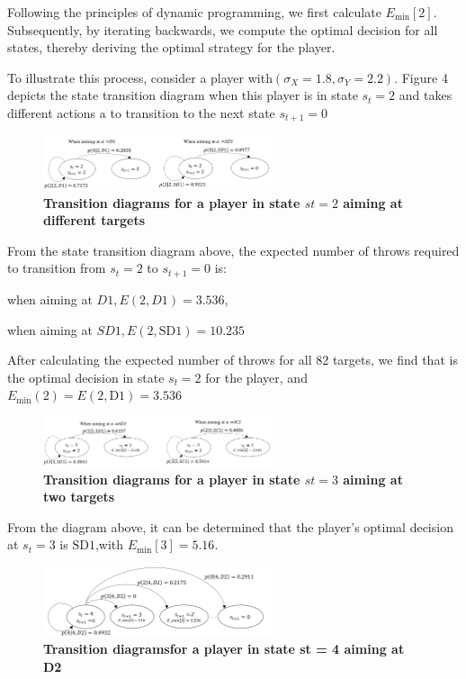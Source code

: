 \documentclass[cjjs]{ipart}
\theoremstyle{plain}
\begin{document}
Following the principles of dynamic programming, we first calculate $E_{\min}[2]$. Subsequently, by iterating backwards, we compute the optimal decision for all states, thereby deriving the optimal strategy for the player.

To illustrate this process, consider a player with$(\sigma_X = 1.8, \sigma_Y = 2.2)$. Figure 4 depicts the state transition diagram when this player is in state $s_t = 2$ and takes different actions a to transition to the next state $s_{t+1} = 0$

\begin{figure}[h]
    \centering
    \includegraphics[width=0.60\textwidth]{6.png} 
    \caption{\textbf{Transition diagrams
for a player in state $st = 2$ aiming at different targets}}
    \label{fig:dartboard}
\end{figure}

From the state transition diagram above, the expected number of throws required to transition from $s_t = 2$ to $s_{t+1} =0$ is:

when aiming at $D1,E(2, D1) = 3.536$,

when aiming at $SD1,E(2, \text{SD1}) = 10.235$

After calculating the expected number of throws for all 82 targets, we find that is the optimal decision in state $s_t = 2$ for the player, and $E_{\min}(2) = E(2, \text{D1}) = 3.536$

\begin{figure}[h]
    \centering
    \includegraphics[width=0.60\textwidth]{7.png} 
    \caption{\textbf{Transition diagrams
for a player in state $st = 3$ aiming at two targets}}
    \label{fig:dartboard}
\end{figure}

From the diagram above, it can be determined that the player's optimal decision at $s_t = 3$ is $\text{SD1}$,with $E_{\min}[3] = 5.16$.

\begin{figure}[h]
    \centering
    \includegraphics[width=0.60\textwidth]{8.png} 
    \caption{\textbf{Transition diagramsfor a player in state st = 4 aiming at D2}}
    \label{fig:dartboard}
\end{figure}
\end{document}
